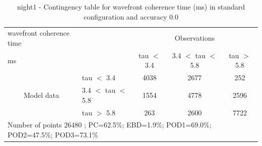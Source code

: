 \begin{table}[p!]
\begin{center}
\begin{tabular}{llccc}
\hline
{wavefront coherence time}                                       &                                                    & \multicolumn{3}{c}{Observations}                 \\
{ms}                                       &                             & tau $<$ 3.4   & 3.4 $<$ tau $<$ 5.8 & tau $>$ 5.8 \\
\hline
\multicolumn{1}{c}{\multirow{3}{*}{Model data}}  & tau $<$ 3.4             & 4038                & 2677                       & 252              \\
                                                 & 3.4  $<$ tau $<$ 5.8 & 1554                & 4778                       & 2596              \\
                                                 & tau $>$ 5.8             & 263                & 2600                       & 7722              \\
\hline
\multicolumn{5}{l}{ Number of points        26480 ; PC=62.5\%; EBD=1.9\%; POD1=69.0\%; POD2=47.5\%; POD3=73.1\%}
\end{tabular}
\end{center}
\caption{night1 - Contingency table for  wavefront coherence time (ms) in standard configuration and accuracy 0.0}
\label{tab:contingencytauBEF:night1}
\end{table}
